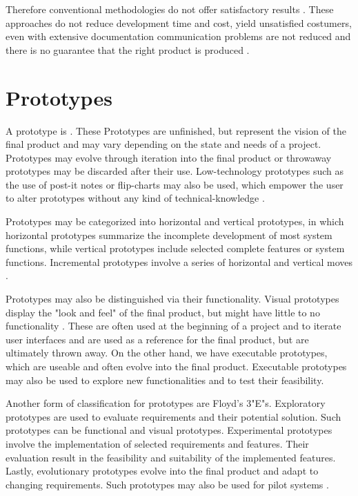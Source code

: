 \documentclass[runningheads]{llncs}
\begin{document}
Therefore conventional methodologies do not offer satisfactory results \cite{ref_RPalternativeStrategy}.
These approaches do not reduce development time and cost, yield unsatisfied costumers,
even with extensive documentation communication problems are not reduced and there is 
no guarantee that the right product is produced \cite{ref_RPalternativeStrategy}.

\section{Prototypes}
A prototype is \cite[a working model of (parts of) an information system, 
which emphasizes specific aspects of that system]{ref_prac}. These Prototypes
are unfinished, but represent the vision of the final product and may vary depending 
on the state and needs of a project. Prototypes may evolve through iteration into the final product or
throwaway prototypes may be discarded after their use. Low-technology prototypes such as the use of post-it 
notes or flip-charts may also be used, which empower the user to alter prototypes 
without any kind of technical-knowledge \cite{ref_prac}. 

Prototypes may be categorized into horizontal and vertical prototypes, in which
horizontal prototypes summarize the incomplete development of most system functions,
while vertical prototypes include selected complete features or system functions.
Incremental prototypes involve a series of horizontal and vertical moves \cite{ref_prac}.

Prototypes may also be distinguished via their functionality. 
Visual prototypes display the "look and feel" of the final product, but might have little 
to no functionality \cite{ref_RPInAction}. These are often used at the beginning of a project and to iterate 
user interfaces and are used as a reference for the final product, but are ultimately thrown away.
On the other hand, we have executable prototypes, which are useable and often evolve into the final product.
Executable prototypes may also be used to explore new functionalities and to test their feasibility\cite{ref_RPInAction}.

Another form of classification for prototypes are Floyd's 3"E"s.
Exploratory prototypes are used to evaluate requirements and their potential solution. Such prototypes can be functional and 
visual prototypes.
Experimental prototypes involve the implementation of selected requirements and features. Their evaluation result in the feasibility
and suitability of the implemented features.
Lastly, evolutionary prototypes evolve into the final product and adapt to changing requirements. Such prototypes may also be used for
pilot systems \cite{ref_ui}.
\end{document}
